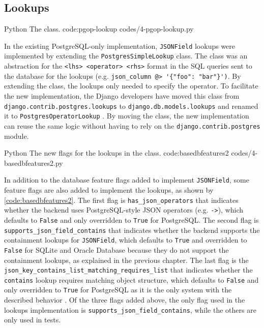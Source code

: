 \subsection{ Lookups}

\listing
{Python}
{The  class.}
{code:pgop-lookup}
{codes/4-pgop-lookup.py}

In the existing PostgreSQL-only implementation, \verb|JSONField| lookups were
implemented by extending the \verb|PostgresSimpleLookup| class. The class was
an abstraction for the \verb|<lhs> <operator> <rhs>| format in the SQL queries
sent to the database for the lookups (e.g.
\verb|json_column @> '{"foo": "bar"}')|. By extending the class, the lookups
only needed to specify the operator. To facilitate the new implementation, the
Django developers have moved this class from
\verb|django.contrib.postgres.lookups| to \verb|django.db.models.lookups| and
renamed it to \verb|PostgresOperatorLookup| \cite{gh-django:pgop-lookup}. By
moving the class, the new implementation can reuse the same logic without
having to rely on the \verb|django.contrib.postgres| module.

\listing
{Python}
{The new flags for the  lookups in the  class.}
{code:basedbfeatures2}
{codes/4-basedbfeatures2.py}

In addition to the database feature flags added to implement \verb|JSONField|,
some feature flags are also added to implement the lookups, as shown by
\autoref{code:basedbfeatures2}. The first flag is \verb|has_json_operators|
that indicates whether the backend uses PostgreSQL-style JSON operators (e.g.
\verb|->|), which defaults to \verb|False| and only overridden to \verb|True|
for PostgreSQL. The second flag is \verb|supports_json_field_contains| that
indicates whether the backend supports the containment lookups for
\verb|JSONField|, which defaults to \verb|True| and overridden to \verb|False|
for SQLite and Oracle Database because they do not support the containment
lookups, as explained in the previous chapter. The last flag is the
\verb|json_key_contains_list_matching_requires_list| that indicates whether the
\verb|contains| lookup requires matching object structure, which defaults to
\verb|False| and only overridden to \verb|True| for PostgreSQL as it is the
only system with the described behavior \cite{postgres:json}. Of the three
flags added above, the only flag used in the lookups implementation is
\verb|supports_json_field_contains|, while the others are only used in tests.

